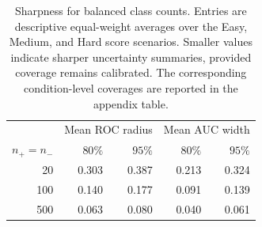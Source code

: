 \begin{table}[t]
\centering
\caption{Sharpness for balanced class counts. Entries are descriptive equal-weight averages over the Easy, Medium, and Hard score scenarios. Smaller values indicate sharper uncertainty summaries, provided coverage remains calibrated. The corresponding condition-level coverages are reported in the appendix table.}
\label{tab:class-counts-balanced-sharpness}
\begingroup
\small
\setlength{\tabcolsep}{6pt}
\renewcommand{\arraystretch}{1.12}
\begin{tabular}{@{}rrrrr@{}}
\hline
 & \multicolumn{2}{c}{Mean ROC radius} & \multicolumn{2}{c}{Mean AUC width} \\
$n_+=n_-$ & $80\%$ & $95\%$ & $80\%$ & $95\%$ \\
\hline
20 & 0.303 & 0.387 & 0.213 & 0.324 \\
100 & 0.140 & 0.177 & 0.091 & 0.139 \\
500 & 0.063 & 0.080 & 0.040 & 0.061 \\
\hline
\end{tabular}
\endgroup
\end{table}
